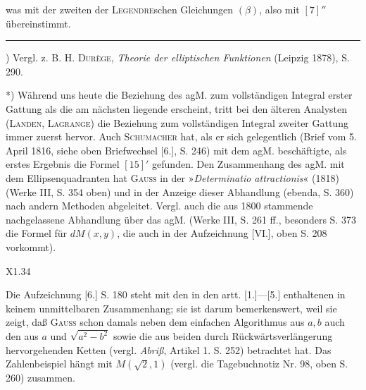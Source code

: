 \noindent was mit der zweiten der \textsc{Legendre}schen Gleichungen $(\beta)$, also mit $[7]''$ übereinstimmt.
\par\smallskip\noindent\rule{.25\linewidth}{.4pt}\par
{\small
\par\indent *) Vergl. z. B. H. \textsc{Durège}, \textit{Theorie der elliptischen Funktionen} (Leipzig 1878), S. 290.
\par\indent **) Während uns heute die Beziehung des agM. zum vollständigen Integral erster Gattung als die am nächsten liegende erscheint, tritt bei den älteren Analysten (\textsc{Landen}, \textsc{Lagrange}) die Beziehung zum vollständigen Integral zweiter Gattung immer zuerst hervor. Auch \textsc{Schumacher} hat, als er sich gelegentlich (Brief vom 5. April 1816, siehe oben Briefwechsel [6.], S. 246) mit dem agM. beschäftigte, als erstes Ergebnis die Formel $[15]'$ gefunden. Den Zusammenhang des agM. mit dem Ellipsenquadranten hat \textsc{Gauss} in der »\textit{Determinatio attractionis}« (1818) (Werke III, S. 354 oben) und in der Anzeige dieser Abhandlung (ebenda, S. 360) nach andern Methoden abgeleitet. Vergl. auch die aus 1800 stammende nachgelassene Abhandlung über das agM. (Werke III, S. 261 ff., besonders S. 373 die Formel für $dM(x,y)$, die auch in der Aufzeichnung [VI.], oben S. 208 vorkommt).
\par}
\noindent X1.\hfill34\par
\clearpage
{}
\par\indent Die Aufzeichnung [6.] S. 180 steht mit den in den artt. [1.]—[5.] enthaltenen in keinem unmittelbaren Zusammenhang; sie ist darum bemerkenswert, weil sie zeigt, daß \textsc{Gauss} schon damals neben dem einfachen Algorithmus aus $a,b$ auch den aus $a$ und $\sqrt{a^2-b^2}$ sowie die aus beiden durch Rückwärtsverlängerung hervorgehenden Ketten (vergl. \textit{Abriß}, Artikel 1. S. 252) betrachtet hat. Das Zahlenbeispiel hängt mit $M(\surd2,1)$ (vergl. die Tagebuchnotiz Nr. 98, oben S. 260) zusammen.
\par\bigskip
